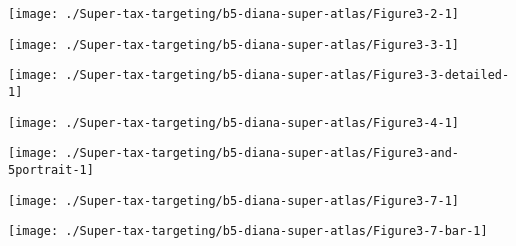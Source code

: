 \documentclass[tikz]{standalone}\usepackage[]{graphicx}\usepackage[]{color}
\newenvironment{knitrout}{}{} %
\begin{document}
\begin{knitrout}
\color{fgcolor}
\texttt{[image: ./Super-tax-targeting/b5-diana-super-atlas/Figure3-2-1]} 

\end{knitrout}

\begin{knitrout}
\color{fgcolor}
\texttt{[image: ./Super-tax-targeting/b5-diana-super-atlas/Figure3-3-1]} 

\end{knitrout}

\begin{knitrout}
\color{fgcolor}
\texttt{[image: ./Super-tax-targeting/b5-diana-super-atlas/Figure3-3-detailed-1]} 

\end{knitrout}

\begin{knitrout}
\color{fgcolor}
\texttt{[image: ./Super-tax-targeting/b5-diana-super-atlas/Figure3-4-1]} 

\end{knitrout}

\begin{knitrout}
\color{fgcolor}
\texttt{[image: ./Super-tax-targeting/b5-diana-super-atlas/Figure3-and-5portrait-1]} 

\end{knitrout}



\begin{knitrout}
\color{fgcolor}
\texttt{[image: ./Super-tax-targeting/b5-diana-super-atlas/Figure3-7-1]} 

\end{knitrout}

\begin{knitrout}
\color{fgcolor}
\texttt{[image: ./Super-tax-targeting/b5-diana-super-atlas/Figure3-7-bar-1]} 

\end{knitrout}
\end{document}

